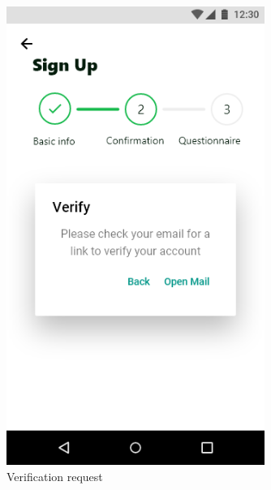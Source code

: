 \documentclass[a4paper,11pt]{article} %
\begin{document}
\begin{figure}[h!]
  \centering
  \includegraphics[width=0.75\textwidth]{img/ui-wireframe/Sign-up-verification-prompt.png}
  \caption{Verification request}
\end{figure}
\end{document}
